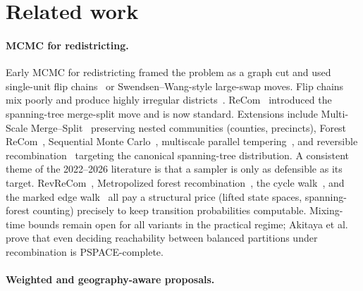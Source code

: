 \documentclass[11pt]{article}
\begin{document}
\section{Related work}\label{sec:related}

\paragraph{MCMC for redistricting.}\label{sec:related-mcmc}

Early MCMC for redistricting framed the problem as a graph cut and used
single-unit flip chains~\cite{fifield2020automated} or
Swendsen--Wang-style large-swap moves. Flip chains mix poorly and
produce highly irregular districts~\cite{deford2021recombination,
najt2024empirical}. ReCom~\cite{deford2021recombination} introduced
the spanning-tree merge-split move and is now standard. Extensions
include Multi-Scale Merge--Split~\cite{autry2020multiscale} preserving
nested communities (counties, precincts), Forest ReCom~\cite{autry2023metropolized},
Sequential Monte Carlo~\cite{mccartan2023sequential}, multiscale
parallel tempering~\cite{chuang2025multiscale}, and reversible
recombination~\cite{cannon2022spanning} targeting the canonical
spanning-tree distribution. A consistent theme of the 2022--2026
literature is that a sampler is only as defensible as its target.
RevReCom~\cite{cannon2022spanning}, Metropolized forest
recombination~\cite{autry2023metropolized}, the cycle
walk~\cite{deford2025cycle}, and the marked edge
walk~\cite{mcwhorter2025marked} all pay a structural price (lifted
state spaces, spanning-forest counting) precisely to keep transition
probabilities computable. Mixing-time bounds remain open for
all variants in the practical regime; Akitaya et
al.~\cite{akitaya2022reconfiguration} prove that even deciding
reachability between balanced partitions under recombination is
PSPACE-complete.

\paragraph{Weighted and geography-aware proposals.}\label{sec:related-weighted}
\end{document}
